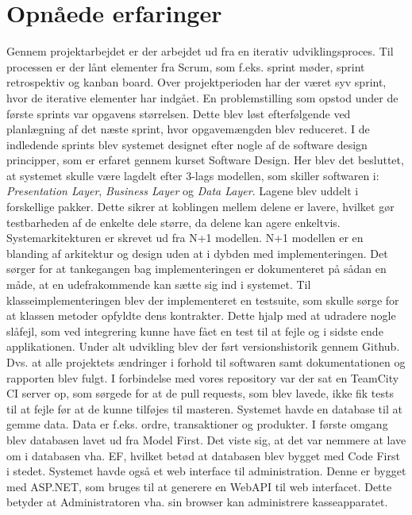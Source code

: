 \section{Opnåede erfaringer}
Gennem projektarbejdet er der arbejdet ud fra en iterativ udviklingsproces. Til processen er der lånt elementer fra Scrum, som f.eks. sprint møder, sprint retrospektiv og kanban board. Over projektperioden har der været syv sprint, hvor de iterative elementer har indgået. En problemstilling som opstod under de første sprints var opgavens størrelsen. Dette blev løst efterfølgende ved planlægning af det næste sprint, hvor opgavemængden blev reduceret.
\newline\newline
I de indledende sprints blev systemet designet efter nogle af de software design principper, som er erfaret gennem kurset Software Design. Her blev det besluttet, at systemet skulle være lagdelt efter 3-lags modellen, som skiller softwaren i: \textit{Presentation Layer}, \textit{Business Layer} og \textit{Data Layer}. Lagene blev uddelt i forskellige pakker. Dette sikrer at koblingen mellem delene er lavere, hvilket gør testbarheden af de enkelte dele større, da delene kan agere enkeltvis.
\newline\newline
Systemarkitekturen er skrevet ud fra N+1 modellen. N+1 modellen er en blanding af arkitektur og design uden at i dybden med implementeringen. Det sørger for at tankegangen bag implementeringen er dokumenteret på sådan en måde, at en udefrakommende kan sætte sig ind i systemet.
\newline\newline 
Til klasseimplementeringen blev der implementeret en testsuite, som skulle sørge for at klassen metoder opfyldte dens kontrakter. Dette hjalp med at udradere nogle slåfejl, som ved integrering kunne have fået en test til at fejle og i sidste ende applikationen.
\newline\newline
Under alt udvikling blev der ført versionshistorik gennem Github. Dvs. at alle projektets ændringer i forhold til softwaren samt dokumentationen og rapporten blev fulgt. I forbindelse med vores repository var der sat en TeamCity CI server op, som sørgede for at de pull requests, som blev lavede, ikke fik tests til at fejle før at de kunne tilføjes til masteren.
\newline\newline
Systemet havde en database til at gemme data. Data er f.eks. ordre, transaktioner og produkter. I første omgang blev databasen lavet ud fra Model First. Det viste sig, at det var nemmere at lave om i databasen vha. EF, hvilket betød at databasen blev bygget med Code First i stedet.
\newline\newline
Systemet havde også et web interface til administration. Denne er bygget med ASP.NET, som bruges til at generere en WebAPI til web interfacet. Dette betyder at Administratoren vha. sin browser kan administrere kasseapparatet.